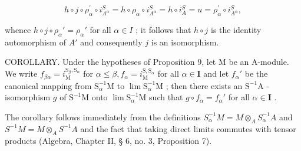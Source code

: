 \[
h \circ j \circ \rho_ {\alpha} ^ {\prime} \circ i _ {A ^ {\alpha}} ^ {S} = h \circ \rho_ {\alpha} \circ i _ {A ^ {\alpha}} ^ {S} = h \circ i _ {A} ^ {S} = u = \rho_ {\alpha} ^ {\prime} \circ i _ {A ^ {\alpha}} ^ {S},
\]

whence \(h \circ j \circ \rho_{\alpha}' = \rho_{\alpha}'\) for all \(\alpha \in I\) ; it follows that \(h \circ j\) is the identity automorphism of \(A'\) and consequently \(j\) is an isomorphism.

COROLLARY. Under the hypotheses of Proposition 9, let M be an A-module. We write \(f_{\beta \alpha} = i_{\mathrm{M}}^{\mathrm{S}_{\beta},\mathrm{S}_{\alpha}}\) for \(\alpha \leqslant \beta, f_{\alpha} = i_{\mathrm{M}}^{\mathrm{S},\mathrm{S}_{\alpha}}\) for all \(\alpha \in \mathbf{I}\) and let \(f_{\alpha}'\) be the canonical mapping from \(\mathrm{S}_{\alpha}^{-1}\mathrm{M}\) to \(\lim \mathrm{S}_{\alpha}^{-1}\mathrm{M}\) ; then there exists an \(\mathrm{S}^{-1}\mathrm{A}\) -isomorphism \(g\) of \(\mathrm{S}^{-1}\mathrm{M}\) onto \(\lim \mathrm{S}_{\alpha}^{-1}\mathrm{M}\) such that \(g \circ f_{\alpha} = f_{\alpha}'\) for all \(\alpha \in \mathbf{I}\) .

The corollary follows immediately from the definitions \(S_{\alpha}^{-1}M = M \otimes_{A} S_{\alpha}^{-1}A\) and \(S^{-1}M = M \otimes_{A} S^{-1}A\) and the fact that taking direct limits commutes with tensor products (Algebra, Chapter II, § 6, no. 3, Proposition 7).

